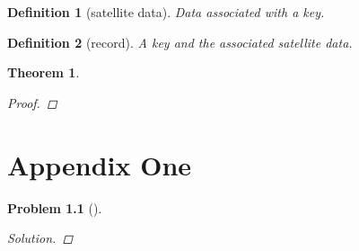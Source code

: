 \documentclass[oneside]{book}
\newtheorem{problem}{Problem}[section]
\newtheorem{definition}{Definition}[chapter]
\newtheorem{thm}{Theorem}[chapter]
\begin{document}
\begin{spacing}{1.618}
\begin{definition}[satellite data]
	Data associated with a key. 
\end{definition}

\begin{definition}[record]
	A key and the associated satellite data.
\end{definition}

\begin{minipage}{\textwidth}
	\label{listing:insertion_sort}
\end{minipage}

\begin{thm}
	
	\begin{proof}
	
	\end{proof}
\end{thm}
\appendix
\chapter{Appendix One}

\begin{problem}[]
	\begin{proof}[Solution]

	\end{proof}
\end{problem}

\end{spacing}
\backmatter

\printglossary[type=\acronymtype]
\clearpage

\printglossary
\clearpage

\printbibliography
\clearpage

\printindex
%
\end{document}
